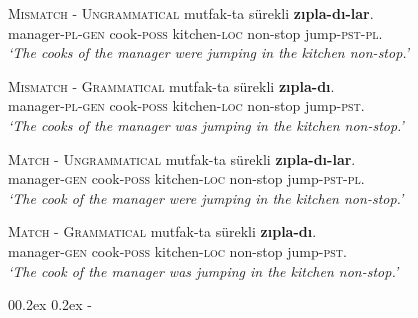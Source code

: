 \documentclass[
  10pt,
  english,
  doc,floatsintext]{apa6}
\makeatletter
\let\oldsubparagraph\subparagraph
\renewcommand{\subparagraph}[1]{\oldsubparagraph{#1}\mbox{}}
\renewcommand{\subparagraph}[1]{\@startsection{subparagraph}{5}{1em}%
  {0\baselineskip \@plus 0.2ex \@minus 0.2ex}%
  {-\z@\relax}%
  {\normalfont\normalsize\itshape\hspace{\parindent}{#1}\textit{\addperi}}{\relax}}
\makeatother
\begin{document}
\begin{exe}
\ex \label{ItemsExpUng}
\begin{xlist}

\ex \textsc{Mismatch - Ungrammatical} \label{item:exp1expitem-plpl} 
 mutfak-ta sürekli \textbf{zıpla-dı-lar}.\\ 
manager-\textsc{pl}-\textsc{gen}  cook-\textsc{poss} kitchen-\textsc{loc} non-stop  jump-\textsc{pst}-\textsc{pl}.\\
\glt \textit{`The cooks of the manager were jumping in the kitchen non-stop.'}

\ex \textsc{Mismatch - Grammatical} \label{item:exp1expitem-plsg} 
 mutfak-ta sürekli \textbf{zıpla-dı}.\\ 
manager-\textsc{pl}-\textsc{gen}  cook-\textsc{poss} kitchen-\textsc{loc} non-stop  jump-\textsc{pst}.\\
\glt \textit{`The cooks of the manager was jumping in the kitchen non-stop.'}

\ex \textsc{Match - Ungrammatical} \label{item:exp1expitem-sgpl} 
 mutfak-ta sürekli \textbf{zıpla-dı-lar}.\\ 
manager-\textsc{gen}  cook-\textsc{poss} kitchen-\textsc{loc} non-stop  jump-\textsc{pst}-\textsc{pl}.\\
\glt \textit{`The cook of the manager were jumping in the kitchen non-stop.'}

\ex \textsc{Match - Grammatical}\label{item:exp1expitem-sgsg}
 mutfak-ta sürekli \textbf{zıpla-dı}. \\ 
manager-\textsc{gen}  cook-\textsc{poss} kitchen-\textsc{loc} non-stop  jump-\textsc{pst}.\\
\glt \textit{`The cook of the manager was jumping in the kitchen non-stop.'}
\end{xlist}
\end{exe}

\hypertarget{filler-items}{%
\subparagraph{Filler Items}\label{filler-items}}
\end{document}
